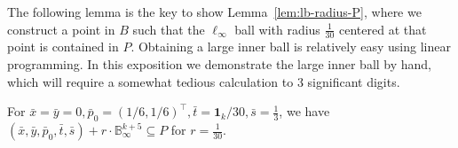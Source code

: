\documentclass{article}\usepackage[a4paper,margin=20mm]{geometry}
\begin{document}
The following lemma is the key to show Lemma~\ref{lem:lb-radius-P}, where we construct a point in $B$ such that the $\ell_\infty$ ball with radius $\frac{1}{30}$ centered at that point is contained in $P$.
Obtaining a large inner ball is relatively easy using linear programming.
In this exposition we demonstrate the large inner ball by hand, which will require a somewhat tedious calculation to 3 significant digits.

\begin{lemma}\label{lem:innerball}
For $\bar x = \bar y = 0, \bar{p}_0 = (1/6,1/6)^\top, \bar t  = \mathbf{1}_{k}/30, \bar{s} = \frac{1}{3}$,
we have $(\bar x, \bar y, \bar{p}_0, \bar t, \bar{s}) + r\cdot \mathbb B_\infty^{k+5} \subseteq P$ for $r = \frac{1}{30}$.
\end{lemma}
\end{document}
